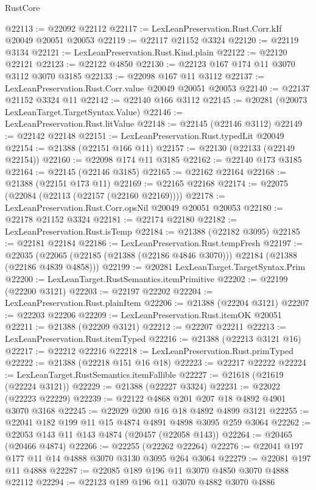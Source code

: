 \begin{lexlean}{RustCore}
\begin{coremodule}
@22113 := @22092 @22112
@22117 := LexLeanPreservation.Rust.Corr.kIf @20049 @20051 @20053
@22119 := @22117 @21152 @3324
@22120 := @22119 @3134
@22121 := LexLeanPreservation.Rust.Kind.plain
@22122 := @22120 @22121
@22123 := @22122 @4850
@22130 := @22123 @167 @174 @11 @3070 @3112 @3070 @3185
@22133 := @22098 @167 @11 @3112
@22137 := LexLeanPreservation.Rust.Corr.value @20049 @20051 @20053
@22140 := @22137 @21152 @3324 @11
@22142 := @22140 @166 @3112
@22145 := @20281 (@20073 LexLeanTarget.TargetSyntax.Value)
@22146 := LexLeanPreservation.Rust.litValue
@22148 := @22145 (@22146 @3112)
@22149 := @22142 @22148
@22151 := LexLeanPreservation.Rust.typedLit @20049
@22154 := @21388 (@22151 @166 @11)
@22157 := @22130 (@22133 (@22149 @22154))
@22160 := @22098 @174 @11 @3185
@22162 := @22140 @173 @3185
@22164 := @22145 (@22146 @3185)
@22165 := @22162 @22164
@22168 := @21388 (@22151 @173 @11)
@22169 := @22165 @22168
@22174 := @22075 (@22084 (@22113 (@22157 (@22160 @22169))))
@22178 := LexLeanPreservation.Rust.Corr.opsNil @20049 @20051 @20053
@22180 := @22178 @21152 @3324
@22181 := @22174 @22180
@22182 := LexLeanPreservation.Rust.isTemp
@22184 := @21388 (@22182 @3095)
@22185 := @22181 @22184
@22186 := LexLeanPreservation.Rust.tempFresh
@22197 := @22035
    (@22065 (@22185 (@21388 (@22186 @4846 @3070))) @22184 (@21388 (@22186 @4839 @4858)))
@22199 := @20281 LexLeanTarget.TargetSyntax.Prim
@22200 := LexLeanTarget.RustSemantics.itemPrimitive
@22202 := @22199 (@22200 @3121)
@22203 := @22197 @22202
@22204 := LexLeanPreservation.Rust.plainItem
@22206 := @21388 (@22204 @3121)
@22207 := @22203 @22206
@22209 := LexLeanPreservation.Rust.itemOK @20051
@22211 := @21388 (@22209 @3121)
@22212 := @22207 @22211
@22213 := LexLeanPreservation.Rust.itemTyped
@22216 := @21388 (@22213 @3121 @16)
@22217 := @22212 @22216
@22218 := LexLeanPreservation.Rust.primTyped
@22222 := @21388 (@22218 @151 @16 @18)
@22223 := @22217 @22222
@22224 := LexLeanTarget.RustSemantics.itemFallible
@22227 := @21618 (@21619 (@22224 @3121))
@22229 := @21388 (@22227 @3324)
@22231 := @22022 (@22223 @22229)
@22239 := @22122 @4868 @201 @207 @18 @4892 @4901 @3070 @3168
@22245 := @22029 @200 @16 @18 @4892 @4899 @3121
@22255 := @22041 @182 @199 @11 @15 @4874 @4891 @4898 @3095 @259 @3064
@22262 := @22053 @143 @11 @143 @4874 (@20457 (@22058 @143))
@22264 := @20465 (@20466 @4874)
@22266 := @22255 (@22262 @22264)
@22276 := @22041 @197 @177 @11 @14 @4888 @3070 @3130 @3095 @264 @3064
@22279 := @22081 @197 @11 @4888
@22287 := @22085 @189 @196 @11 @3070 @4850 @3070 @4888 @22112
@22294 := @22123 @189 @196 @11 @3070 @4882 @3070 @4886

\end{coremodule}
\end{lexlean}
